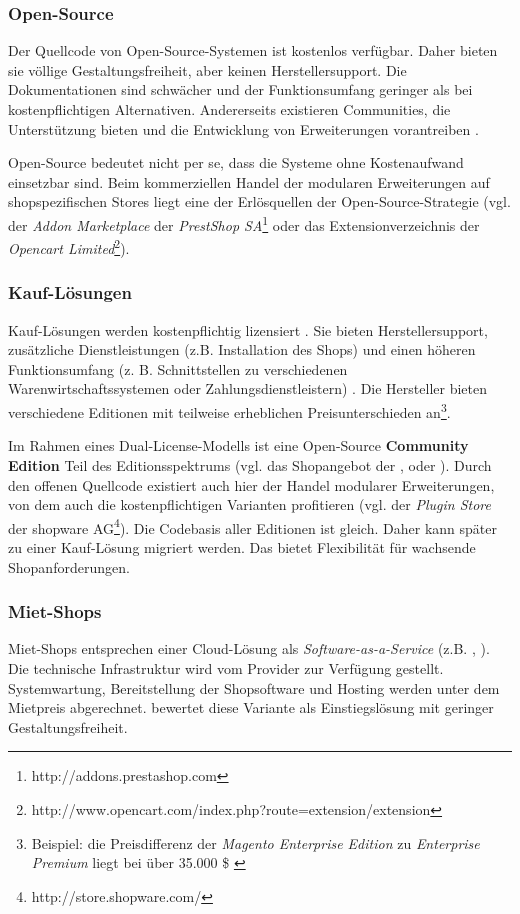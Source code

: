 \documentclass[11pt, a4paper, titlepage, listof=totoc, bibliography=totoc, index=totoc, twoside, openright, headings=normal]{scrreprt}
\begin{document}
\subsubsection*{Open-Source}
Der Quellcode von Open-Source-Systemen ist kostenlos verfügbar. Daher bieten sie völlige Gestaltungsfreiheit, aber keinen Herstellersupport. Die Dokumentationen sind schwächer und der Funktionsumfang geringer als bei kostenpflichtigen Alternativen. Andererseits existieren Communities, die Unterstützung bieten und die Entwicklung von Erweiterungen vorantreiben \citep{stahl15}.

Open-Source bedeutet nicht per se, dass die Systeme ohne Kostenaufwand einsetzbar sind. Beim kommerziellen Handel der modularen Erweiterungen auf shopspezifischen Stores liegt eine der Erlösquellen der Open-Source-Strategie (vgl. der \emph{Addon Marketplace} der \emph{PrestShop SA}\footnote{http://addons.prestashop.com} oder das Extensionverzeichnis der \emph{Opencart Limited}\footnote{http://www.opencart.com/index.php?route=extension/extension}).

\subsubsection*{Kauf-Lösungen}
Kauf-Lösungen werden kostenpflichtig lizensiert \citep[z.B.][]{shopwarePricing}. Sie bieten Herstellersupport, zusätzliche Dienstleistungen (z.B. Installation des Shops) und einen höheren Funktionsumfang (z. B. Schnittstellen zu verschiedenen Warenwirtschaftssystemen oder Zahlungsdienstleistern) \citep{stahl15}. Die Hersteller bieten verschiedene Editionen mit teilweise erheblichen Preisunterschieden an\footnote{Beispiel: die Preisdifferenz der \emph{Magento Enterprise Edition} zu \emph{Enterprise Premium} liegt bei über 35.000 \$ \citep[vgl][]{fwpShop}}.

Im Rahmen eines Dual-License-Modells ist eine Open-Source \textbf{Community Edition} Teil des Editionsspektrums \citep{t3n14} (vgl. das Shopangebot der \citet{magentoShops}, \citet{shopwarePricing} oder \citet{oxidShops}). Durch den offenen Quellcode existiert auch hier der Handel modularer Erweiterungen, von dem auch die kostenpflichtigen Varianten profitieren (vgl. der \emph{Plugin Store} der shopware AG\footnote{http://store.shopware.com/}). Die Codebasis aller Editionen ist gleich. Daher kann später zu einer Kauf-Lösung migriert werden. Das bietet Flexibilität für wachsende Shopanforderungen.

\subsubsection*{Miet-Shops}
Miet-Shops entsprechen einer Cloud-Lösung als \emph{Software-as-a-Service} (z.B. \citet{stratoWebshops}, \citet{shopify15}). Die technische Infrastruktur wird vom Provider zur Verfügung gestellt. Systemwartung, Bereitstellung der Shopsoftware und Hosting werden unter dem Mietpreis abgerechnet. \citet{stahl15} bewertet diese Variante als Einstiegslösung mit geringer Gestaltungsfreiheit.
\end{document}
